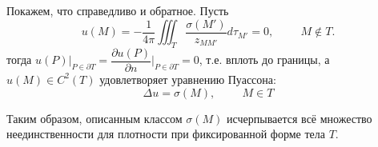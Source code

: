 \documentclass{article}
\begin{document}
\noindent Покажем, что справедливо и обратное.
Пусть 
$$
u(M) = - \dfrac{1}{4 \pi} \iiint_T \dfrac{\sigma(M')}{z_{MM'}} d \tau_{M'} = 0, \hspace{1cm} M \nin T.
$$
тогда $u(P)|_{P \in \partial T} = \dfrac{\partial u(P)}{\partial n} \bigg|_{P \in \partial T} = 0$, т.е. вплоть до границы, а $u(M) \in C^2(T)$  удовлетворяет уравнению Пуассона:
\[
\Delta u = \sigma (M), \hspace{1cm}  M \in T
\]

Таким образом, описанным классом $\sigma(M)$ исчерпывается всё множество неединственности для плотности при фиксированной форме тела $T$.
\end{document}
